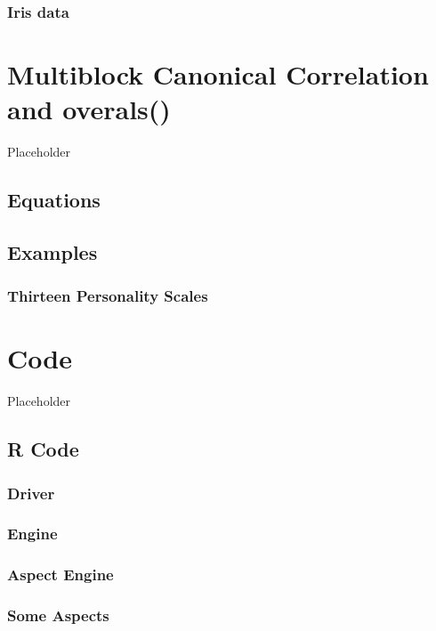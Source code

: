 \documentclass[
  12pt,
]{book}
\begin{document}
\subsection{Iris data}\label{iris-data}

\chapter{Multiblock Canonical Correlation and overals()}\label{multiblock-canonical-correlation-and-overals}

Placeholder

\section{Equations}\label{equations-6}

\section{Examples}\label{examples-6}

\subsection{Thirteen Personality Scales}\label{thirteen-personality-scales-2}

\chapter{Code}\label{code}

Placeholder

\section{R Code}\label{r-code}

\subsection{Driver}\label{driver}

\subsection{Engine}\label{engine}

\subsection{Aspect Engine}\label{aspect-engine}

\subsection{Some Aspects}\label{some-aspects}
\end{document}

